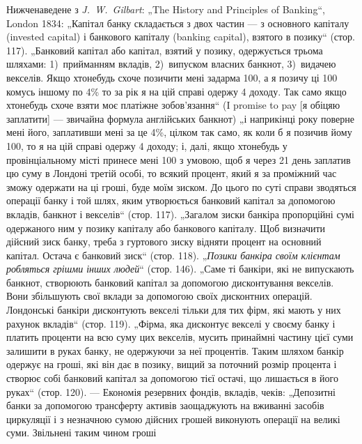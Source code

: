 Нижченаведене з \emph{J.~W.~Gilbart}: „The History and Principles of Banking“,
London 1834: „Капітал банку складається з двох частин — з основного капіталу
(invested capital) і банкового капіталу (banking capital), взятого в позику“ (стор. 117).
„Банковий капітал або капітал, взятий у позику, одержується трьома шляхами:
1)~прийманням вкладів, 2)~випуском власних банкнот, 3)~видачею векселів. Якщо
хтонебудь схоче позичити мені задарма 100, а я позичу ці
100 комусь іншому по 4\% то за рік я на цій справі одержу
4 доходу. Так само якщо хтонебудь схоче взяти моє платіжне
зобов’язання“ (I promise to pay [я обіцяю заплатити] — звичайна формула англійських банкнот) „і
наприкінці року поверне мені його, заплативши мені за це 4\%, цілком так само, як коли б я позичив
йому 100, то я на цій справі одержу 4 доходу; і, далі, якщо
хтонебудь у провінціальному місті принесе мені 100 з умовою, щоб я через 21 день
заплатив цю суму в Лондоні третій особі, то всякий процент, який я за проміжний час зможу одержати
на ці гроші, буде моїм зиском. До цього по суті справи зводяться операції банку і той шлях, яким
утворюється банковий капітал за допомогою вкладів, банкнот і векселів“ (стор. 117). „Загалом зиски
банкіра пропорційні сумі одержаного ним у позику капіталу або банкового капіталу. Щоб визначити
дійсний зиск банку, треба з гуртового зиску відняти процент на основний капітал. Остача є банковий
зиск“ (стор. 118). „\emph{Позики банкіра своїм клієнтам робляться грішми інших людей}“ (стор. 146). „Саме
ті банкіри, які не випускають банкнот, створюють банковий капітал за допомогою дисконтування
векселів. Вони збільшують свої вклади за допомогою своїх дисконтних операцій. Лондонські банкіри
дисконтують векселі тільки для тих фірм, які мають у них рахунок вкладів“ (стор. 119). „Фірма, яка
дисконтує векселі у своєму банку і платить проценти на всю суму цих векселів, мусить принаймні
частину цієї суми залишити
в руках банку, не одержуючи за неї процентів. Таким шляхом банкір одержує на гроші, які він дає в
позику, вищий за поточний розмір процента і
створює собі банковий капітал за допомогою тієї остачі, що лишається в його руках“ (стор. 120). —
Економія резервних фондів, вкладів, чеків: „Депозитні банки за
допомогою трансферту активів заощаджують на вживанні засобів циркуляції і з
незначною сумою дійсних грошей виконують операції на великі суми. Звільнені таким чином гроші

